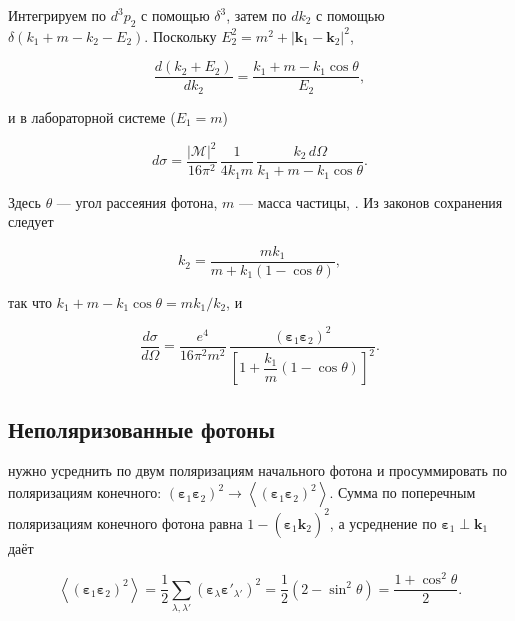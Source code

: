 \documentclass[../final.tex]{subfiles}
\begin{document}
Интегрируем по $d^3p_2$ с помощью $\delta^3$, затем по $dk_2$
с помощью $\delta(k_1+m-k_2-E_2)$. Поскольку
$E_2^2=m^2+|\mathbf k_1-\mathbf k_2|^2$,

\begin{equation*}
    \frac{d(k_2+E_2)}{dk_2}
    =
    \frac{k_1+m-k_1\cos\theta}{E_2},
\end{equation*}

и в лабораторной системе ($E_1=m$)

\begin{equation*}
    d\sigma
    =
    \frac{|\mathcal M|^2}{16\pi^2}\,
    \frac{1}{4k_1m}\,
    \frac{k_2\,d\Omega}{k_1+m-k_1\cos\theta}.
\end{equation*}

Здесь $\theta$ --- угол рассеяния фотона, $m$ --- масса частицы,
. Из законов сохранения
следует 

\begin{equation*}
    k_2
    =
    \frac{mk_1}{m+k_1\left(1-\cos\theta\right)},
\end{equation*}

так что $k_1+m-k_1\cos\theta=mk_1/k_2$, и

\begin{equation*}
    \frac{d\sigma}{d\Omega}
    =
    \frac{e^4}{16\pi^2m^2}\,
    \frac{\left(\boldsymbol\varepsilon_1\boldsymbol\varepsilon_2\right)^2}
         {\left[1+\dfrac{k_1}{m}\left(1-\cos\theta\right)\right]^2}.
\end{equation*}


\subsection{Неполяризованные фотоны}

 нужно усреднить по двум
поляризациям начального фотона и просуммировать по поляризациям
конечного:
$\left(\boldsymbol\varepsilon_1\boldsymbol\varepsilon_2\right)^2
\to\left\langle\left(\boldsymbol\varepsilon_1\boldsymbol\varepsilon_2\right)^2\right\rangle$.
Сумма по поперечным поляризациям конечного фотона равна
$1-(\boldsymbol\varepsilon_1\hat{\mathbf k}_2)^2$, а усреднение по
$\boldsymbol\varepsilon_1\perp\mathbf k_1$ даёт

\begin{equation*}
    \left\langle
        \left(\boldsymbol\varepsilon_1\boldsymbol\varepsilon_2\right)^2
    \right\rangle
    =
    \frac{1}{2}\sum_{\lambda,\lambda'}
    \left(\boldsymbol\varepsilon_\lambda\boldsymbol\varepsilon'_{\lambda'}\right)^2
    =
    \frac{1}{2}\left(2-\sin^2\theta\right)
    =
    \frac{1+\cos^2\theta}{2}.
\end{equation*}
\end{document}
